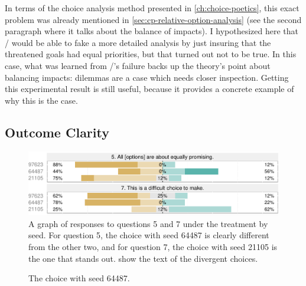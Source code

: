 In terms of the choice analysis method presented in \cref{ch:choice-poetics}, this exact problem was already mentioned in \cref{sec:cp-relative-option-analysis} (see the second paragraph where it talks about the balance of impacts).
%
I hypothesized here that \dunyazad/ would be able to fake a more detailed analysis by just insuring that the threatened goals had equal priorities, but that turned out not to be true.
%
In this case, what was learned from \dunyazad/'s failure backs up the theory's point about balancing impacts: dilemmas are a case which needs closer inspection.
%
Getting this experimental result is still useful, because it provides a concrete example of why this is the case.


\subsection{Outcome Clarity}


\begin{figure}[!p]
  \includegraphics[width=\textwidth]{fig/obvious-q5-q7.pdf}
  \caption[Prospective balance and difficulty responses for ``obvious'' choices]{A graph of responses to questions 5 and 7 under the \obv{} treatment by seed. For question 5, the choice with seed 64487 is clearly different from the other two, and for question 7, the choice with seed 21105 is the one that stands out.  show the text of the divergent choices.}
  \label{fig:e1-obviousq57}
\end{figure}

\begin{figure}[!p]
\centering
{}
\caption[``Obvious'' choice 64487]{The \obv{} choice with seed 64487.}
  \label{fig:e1-seed-64487}
\end{figure}

